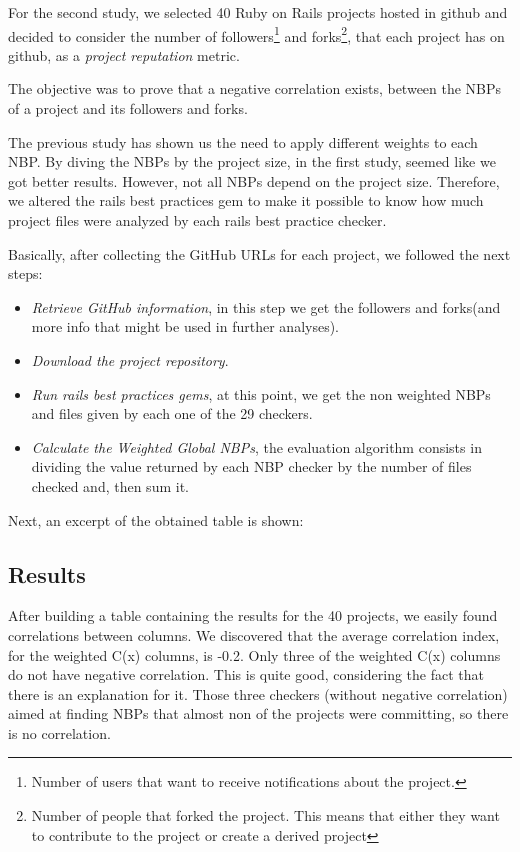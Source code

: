 For the second study, we selected 40 Ruby on Rails projects hosted in github and
decided to consider the number of 
\textsf{followers}\footnote{Number of users that want to receive notifications about the project.} and
\textsf{forks}\footnote{Number of people that forked the project. This means that either they want to contribute to the project or create a derived project}, 
that each project has on github, 
as a \emph{project reputation} metric. 

The objective was to prove that a negative correlation exists, between the NBPs of a project and its followers and forks. 

The previous study has shown us the need to apply different weights to each NBP. 
By diving the NBPs by the project size, in the first study, seemed like we got better results.
However, not all NBPs depend on the project size. 
Therefore, we altered the rails best practices gem to make it possible to know how much project files were analyzed 
by each rails best practice checker.

Basically, after collecting the GitHub URLs for each project, we followed the next steps:
\begin{itemize}
\item \emph{Retrieve GitHub information}, in this step we get the followers and forks(and more info that might be used in further analyses).
\item \emph{Download the project repository}.
\item \emph{Run rails best practices gems}, at this point, we get the non weighted NBPs and files given by each one of the 29 checkers.
\item \emph{Calculate the Weighted Global NBPs}, the evaluation algorithm consists in dividing the value returned by each NBP checker  by the number of files checked and, then sum it.
\end{itemize}

Next, an excerpt of the obtained table is shown:


\subsection{Results}\label{subsec:results}
After building a table containing the results for the 40 projects, we easily found correlations between columns.
We discovered that the average correlation index, for the weighted C(x) columns, is -0.2. Only three of the weighted C(x) columns do not have negative correlation. This is quite good, considering the fact that there is an explanation for it. 
Those three checkers (without negative correlation) aimed at finding  NBPs that almost non of the projects were committing, 
so there is no correlation.



